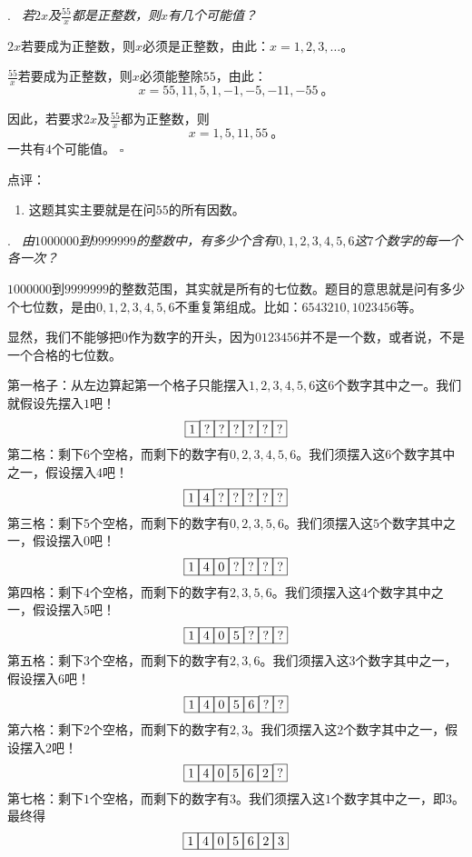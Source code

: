 \documentclass[a4,12pt]{article}
\newcounter{Problem}
\newcommand{\Problem}[2]{
		\vspace*{10pt}
		\label{Problem #1}
		\noindent#1.\emph{~#2}
	}
\newcommand{\Qed}{\hfill\ensuremath{\square}}
\begin{document}
\pagebreak
\Problem{8}{
	若$2x$及$\frac{55}{x}$都是正整数，则$x$有几个可能值？
	}

	$2x$若要成为正整数，则$x$必须是正整数，由此：$x=1, 2, 3, \ldots$。

	$\frac{55}{x}$若要成为正整数，则$x$必须能整除$55$，由此：
	\[ x = 55, 11, 5, 1, -1, -5, -11, -55 \ \mbox{。} \]

	因此，若要求$2x$及$\frac{55}{x}$都为正整数，则
	\[ x = 1, 5, 11, 55 \ \mbox{。} \]
	一共有$4$个可能值。
	\Qed
	\vspace*{30pt}

	\noindent 点评：
	\begin{enumerate}[label=(\alph*)]
		\item 这题其实主要就是在问$55$的所有因数。
	\end{enumerate}

\pagebreak
\Problem{10}{
	由$1000000$到$9999999$的整数中，有多少个含有$0, 1, 2, 3, 4, 5, 6$这$7$个数字的每一个各一次？
	}

	$1000000$到$9999999$的整数范围，其实就是所有的七位数。题目的意思就是问有多少个七位数，是由$0, 1, 2, 3, 4, 5, 6$不重复第组成。比如：$6543210, 1023456$等。

	显然，我们不能够把$0$作为数字的开头，因为$0123456$并不是一个数，或者说，不是一个合格的七位数。

	第一格子：从左边算起第一个格子只能摆入$1, 2, 3, 4, 5, 6$这{\color{red}$6$个数字其中之一}。我们就假设先摆入$1$吧！
	\[ \fbox{1}\fbox{?}\fbox{?}\fbox{?}\fbox{?}\fbox{?}\fbox{?} \]
	第二格：剩下$6$个空格，而剩下的数字有$0, 2, 3, 4, 5, 6$。我们须摆入这{\color{red}$6$个数字其中之一}，假设摆入$4$吧！
	\[ \fbox{1}\fbox{4}\fbox{?}\fbox{?}\fbox{?}\fbox{?}\fbox{?} \]
	第三格：剩下$5$个空格，而剩下的数字有$0, 2, 3, 5, 6$。我们须摆入这{\color{red}$5$个数字其中之一}，假设摆入$0$吧！
	\[ \fbox{1}\fbox{4}\fbox{0}\fbox{?}\fbox{?}\fbox{?}\fbox{?} \]
	第四格：剩下$4$个空格，而剩下的数字有$2, 3, 5, 6$。我们须摆入这{\color{red}$4$个数字其中之一}，假设摆入$5$吧！
	\[ \fbox{1}\fbox{4}\fbox{0}\fbox{5}\fbox{?}\fbox{?}\fbox{?} \]
	第五格：剩下$3$个空格，而剩下的数字有$2, 3, 6$。我们须摆入这{\color{red}$3$个数字其中之一}，假设摆入$6$吧！
	\[ \fbox{1}\fbox{4}\fbox{0}\fbox{5}\fbox{6}\fbox{?}\fbox{?} \]
	第六格：剩下$2$个空格，而剩下的数字有$2, 3$。我们须摆入这{\color{red}$2$个数字其中之一}，假设摆入$2$吧！
	\[ \fbox{1}\fbox{4}\fbox{0}\fbox{5}\fbox{6}\fbox{2}\fbox{?} \]
	第七格：剩下$1$个空格，而剩下的数字有$3$。我们须摆入这{\color{red}$1$个数字其中之一}，即$3$。最终得
	\[ \fbox{1}\fbox{4}\fbox{0}\fbox{5}\fbox{6}\fbox{2}\fbox{3} \]
\end{document}
